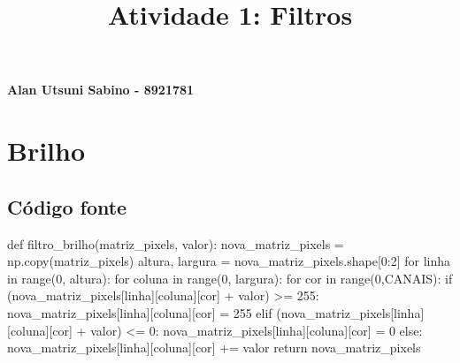 \documentclass[a4paper,12pt]{article}
\begin{document}
\title{ \large \textbf{Atividade 1: Filtros}}
\date{\vspace{-5ex}}
\maketitle

\begin{flushright}
  { \bf Alan Utsuni Sabino - 8921781}
\end{flushright}


\section{Brilho}
\subsection{Código fonte}
\begin{python}
def filtro_brilho(matriz_pixels, valor):
  nova_matriz_pixels = np.copy(matriz_pixels)
  altura, largura = nova_matriz_pixels.shape[0:2]
  for linha in range(0, altura):
    for coluna in range(0, largura):
        for cor in range(0,CANAIS):
            if (nova_matriz_pixels[linha][coluna][cor] + valor) >= 255:
                nova_matriz_pixels[linha][coluna][cor] = 255
            elif  (nova_matriz_pixels[linha][coluna][cor] + valor) <= 0:
                nova_matriz_pixels[linha][coluna][cor] = 0
            else:
                nova_matriz_pixels[linha][coluna][cor] += valor
  return nova_matriz_pixels
\end{python}
\end{document}
